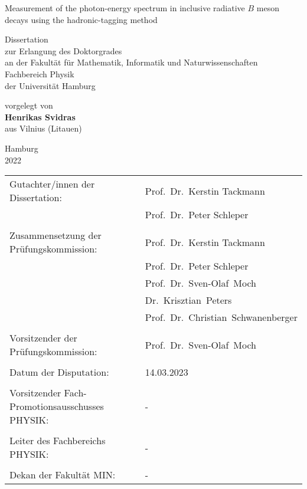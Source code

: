 \thispagestyle{empty}
\begin{center}
\huge{Measurement of the photon-energy spectrum in inclusive radiative $B$ meson
decays using the hadronic-tagging method}

\vspace{0.2\textheight}
\large{Dissertation \\ zur Erlangung des Doktorgrades \\ an der Fakult\"at f\"ur Mathematik, Informatik und Naturwissenschaften \\ Fachbereich Physik \\ der Universit\"at Hamburg}

\vspace{0.2\textheight}
\large{vorgelegt von \\ \textbf{Henrikas Svidras} \\ aus Vilnius (Litauen)}

\vspace{0.1\textheight}
\large{Hamburg \\ 2022}
\end{center}

\newpage
\thispagestyle{empty}

\newpage
\thispagestyle{empty}

\vspace*{\fill}

\begin{tabular*}{\textwidth}{l @{\extracolsep{\fill}} l}
Gutachter/innen der Dissertation: & Prof.~Dr.~Kerstin Tackmann  \\
& Prof.~Dr.~Peter Schleper \\
\\
Zusammensetzung der Prüfungskommission: & Prof.~Dr.~Kerstin Tackmann\\
& Prof.~Dr.~Peter Schleper\\
& Prof.~Dr.~Sven-Olaf~Moch \\
& Dr.~Krisztian~Peters  \\
& Prof.~Dr.~Christian~Schwanenberger \\
\\
Vorsitzender der Prüfungskommission: & Prof.~Dr.~Sven-Olaf~Moch \\
\\
Datum der Disputation: & 14.03.2023 \\ %
\\
Vorsitzender Fach-Promotionsausschusses PHYSIK: &  - \\
\\
Leiter des Fachbereichs PHYSIK: & - \\
\\
Dekan der Fakultät MIN: & - \\
\end{tabular*}

\newpage
\thispagestyle{empty}
